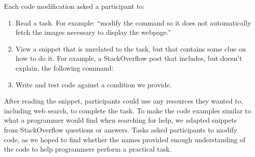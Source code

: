 \begin{changes}
Each code modification asked a participant to:
\begin{enumerate}
\item Read a task.  For example: ``modify the command so it does not automatically fetch the images necessary to display the webpage.''
\item View a snippet that is unrelated to the task, but that contains some clue on how to do it.  For example, a StackOverflow post that includes, but doesn't explain, the following command:
\vspace{.2em}
\vspace{.2em}
\item Write and test code against a condition we provide.
\end{enumerate}

After reading the snippet, participants could use any resources they wanted to, including web search, to complete the task.
To make the code examples similar to what a programmer would find when searching for help, we adapted snippets from StackOverflow questions or answers.
Tasks asked participants to modify code, as we hoped to find whether the \Glspl{name} provided enough understanding of the code to help programmers perform a practical task.
\end{changes}

